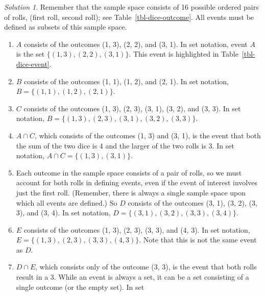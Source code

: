 \documentclass[
  letterpaper,
  DIV=11,
  numbers=noendperiod]{scrreprt}
\providecommand{\tightlist}{%
  \setlength{\itemsep}{0pt}\setlength{\parskip}{0pt}}
\theoremstyle{plain}
\theoremstyle{definition}
\theoremstyle{definition}
\theoremstyle{definition}
\theoremstyle{remark}
\newtheorem{refsolution}{Solution}[chapter]
\begin{document}
\begin{tcolorbox}[enhanced jigsaw, opacityback=0, rightrule=.15mm, coltitle=black, colframe=quarto-callout-tip-color-frame, toprule=.15mm, colbacktitle=quarto-callout-tip-color!10!white, opacitybacktitle=0.6, left=2mm, toptitle=1mm, breakable, title={Solution (click to expand)}, bottomtitle=1mm, colback=white, leftrule=.75mm, titlerule=0mm, arc=.35mm, bottomrule=.15mm]

\begin{refsolution}
Remember that the sample space consists of 16 possible ordered pairs of
rolls, (first roll, second roll); see Table~\ref{tbl-dice-outcome}. All
events must be defined as subsets of this sample space.

\begin{enumerate}
\def\labelenumi{\arabic{enumi}.}
\tightlist
\item
  \(A\) consists of the outcomes (1, 3), (2, 2), and (3, 1). In set
  notation, event \(A\) is the set \(\{(1, 3), (2, 2), (3, 1)\}\). This
  event is highlighted in Table~\ref{tbl-dice-event}.
\item
  \(B\) consists of the outcomes (1, 1), (1, 2), and (2, 1). In set
  notation, \(B = \{(1, 1), (1, 2), (2, 1)\}\).
\item
  \(C\) consists of the outcomes (1, 3), (2, 3), (3, 1), (3, 2), and (3,
  3). In set notation,
  \(B = \{(1, 3), (2, 3), (3, 1), (3, 2), (3, 3)\}\).
\item
  \(A\cap C\), which consists of the outcomes (1, 3) and (3, 1), is the
  event that both the sum of the two dice is 4 and the larger of the two
  rolls is 3. In set notation, \(A \cap C = \{(1, 3), (3, 1)\}\).
\item
  Each outcome in the sample space consists of a pair of rolls, so we
  must account for both rolls in defining events, even if the event of
  interest involves just the first roll. (Remember, there is always a
  single sample space upon which all events are defined.) So \(D\)
  consists of the outcomes (3, 1), (3, 2), (3, 3), and (3, 4). In set
  notation, \(D = \{(3, 1), (3, 2), (3, 3), (3, 4)\}\).
\item
  \(E\) consists of the outcomes (1, 3), (2, 3), (3, 3), and (4, 3). In
  set notation, \(E = \{(1, 3), (2, 3), (3, 3), (4, 3)\}\). Note that
  this is not the same event as \(D\).
\item
  \(D \cap E\), which consists only of the outcome (3, 3), is the event
  that both rolls result in a 3. While an event is always a set, it can
  be a set consisting of a single outcome (or the empty set). In set

\end{enumerate}
\end{refsolution}
\end{tcolorbox}
\end{document}
